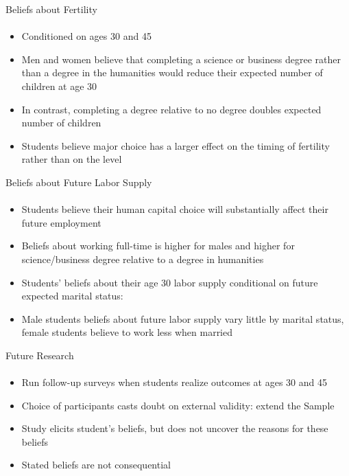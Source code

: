 \documentclass[12pt]{beamer}
\begin{document}
\begin{frame}{Beliefs about Fertility}
    \framesubtitle{} 
    \begin{itemize}
        \item Conditioned on ages 30 and 45
        \item Men and women believe that completing a science or business degree rather than a degree in the humanities would reduce their expected number of children at age 30
        \item In contrast, completing a degree relative to no degree doubles expected number of children
        \item Students believe major choice has a larger effect on the timing of fertility rather than on the level
    \end{itemize}
\end{frame}

\begin{frame}{Beliefs about Future Labor Supply}
    \framesubtitle{} 
    \begin{itemize}
        \item Students believe their human capital choice will substantially affect their future employment
        \item Beliefs about working full-time is higher for males and higher for science/business degree relative to a degree in humanities
        \item Students' beliefs about their age 30 labor supply conditional on future expected marital status:
        \item Male students beliefs about future labor supply vary little by marital status, female students believe to work less when married
    \end{itemize}
\end{frame}

\begin{frame}{Future Research}
    \framesubtitle{} 
    \begin{itemize}
        \item Run follow-up surveys when students realize outcomes at ages 30 and 45
        \item Choice of participants casts doubt on external validity: extend the Sample
        \item Study elicits student's beliefs, but does not uncover the reasons for these beliefs
        \item Stated beliefs are not consequential
    \end{itemize}
\end{frame}
\end{document}
